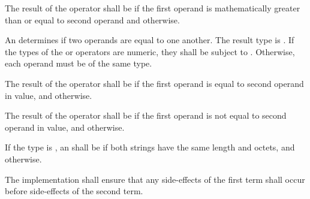 \specsubsubitem
The result of the \terminal{>=} operator shall be  if the first
operand is mathematically greater than or equal to second operand
and  otherwise.

\specsubsubitem
An  determines if two operands are equal to one
another. The result type is . If the types of the \terminal{==}
or \terminal{!=} operators are numeric, they shall be subject to
. Otherwise, each operand must be of the same type.

\specsubsubitem
The result of the \terminal{==} operator shall be  if the first
operand is equal to second operand in value, and  otherwise.

\specsubsubitem
The result of the \terminal{!=} operator shall be  if the first
operand is not equal to second operand in value, and  otherwise.

\specsubsubitem
If the type is , an  shall be
 if both strings have the same length and octets, and
 otherwise.

\specsubsubitem
The implementation shall ensure that any side-effects of the first term shall
occur before side-effects of the second term.


\begin{grammar}
 \\
	 \\
	 \terminal{\&\&}  \\

 \\
	 \\
	 \terminal{\textasciicircum\textasciicircum}  \\

 \\
	 \\
	 \terminal{||}  \\
\end{grammar}

